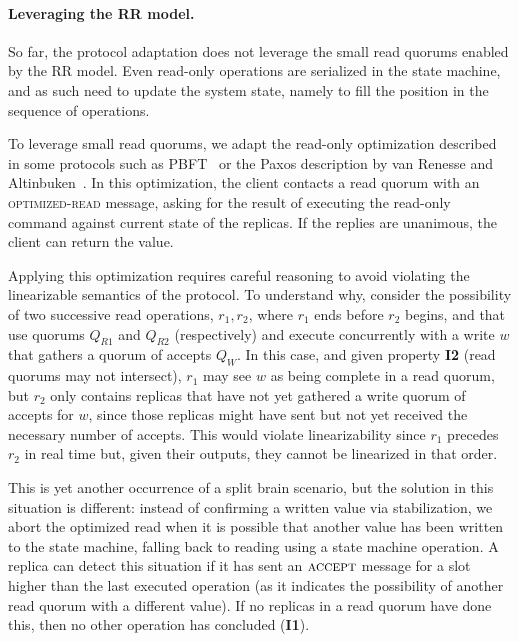 \paragraph{Leveraging the \ac{RR} model.}
So far, the protocol adaptation does not leverage the
small read quorums enabled by the \ac{RR} model. Even
read-only operations are serialized in the state machine, and as
such need to update the system state, namely to fill the position
in the sequence of operations.

To leverage small read quorums, we adapt the read-only
optimization described in some protocols such as PBFT~\cite{pbft} or
the Paxos description by van Renesse and Altinbuken~\cite{pmmc}.  In
this optimization, the client contacts a read quorum with an
\textsc{optimized-read} message, asking for the
result of executing the read-only command against current state of the
replicas. If the replies are unanimous, the client can return the
value.

Applying this optimization requires careful reasoning to avoid violating
the linearizable semantics of the protocol. To understand why,
consider the possibility
of two successive read operations, $r_1, r_2$, where $r_1$ ends before
$r_2$ begins, and that use quorums $Q_{R1}$ and $Q_{R2}$
(respectively) and execute concurrently with a write $w$ that
gathers a quorum of accepts $Q_W$. In this case, and given property \textbf{I2}
(read quorums may not intersect), $r_1$ may see $w$ as being complete in a read quorum,
but $r_2$ only contains replicas that have not yet gathered a write
quorum of accepts for $w$, since those replicas might have sent but
not yet received the necessary number of accepts.
This would violate linearizability since $r_1$ precedes $r_2$ in real time
but, given their outputs, they cannot be linearized in that order.

This is yet another occurrence of a split brain scenario, but
the solution in this situation is different: instead of
confirming a written value via stabilization, we abort the
optimized read when it is possible that another value has been
written to the state machine, falling back to reading using a
state machine operation. A replica can detect this situation if
it has sent an $\textsc{accept}$ message for a slot
higher than the last executed operation (as it indicates the
possibility of another read quorum with a different value). If no
replicas in a read quorum have done this, then no other operation
has concluded (\textbf{I1}).

